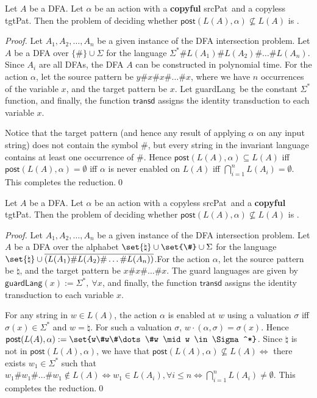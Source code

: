 \documentclass[12pt, a4paper]{article}
\newcommand{\T}{\textsf{transd}}
\newcommand{\post}{\textsf{post}}
\newcommand{\spat}{\textsf{srcPat}}
\newcommand{\tpat}{\textsf{tgtPat}}
\newcommand{\guardL}{\textsf{guardLang}}
\newcommand{\alphabet}{\Sigma}
\renewcommand{\aut}{A}
\begin{document}
\begin{lemma}
	Let $A$ be a DFA. Let $\alpha$ be an action with a \textbf{copyful} \spat\ and a copyless \tpat. Then the problem of deciding whether
	$\post(L(A), \alpha) \not\subseteq L(A)$ is \psph.
\end{lemma}
%
\begin{proof}
	Let $A_1, A_2, \dots, A_n$ be a given instance of the DFA intersection problem. Let $\aut$ be a DFA over  $\{\# \} \cup \alphabet$ for the
	language $\Sigma^*\#L(A_1)\#L(A_2)\#\dots\#L(A_n).$ Since $A_i$ are all DFAs, the DFA $\aut$ can be constructed in polynomial time. For
	the action $\alpha$, let the source pattern be $y\#x\#x\#\dots\#x$, where we have $n$ occurrences of the variable $x$, and the target
	pattern be $x$. Let \guardL\ be the constant $\Sigma^*$ function, and finally, the function $\T$ assigns the identity transduction to each
	variable $x$.
	\medskip

	Notice that the target pattern (and hence any result of applying $\alpha$ on any input string) does not contain the symbol \#, but every
	string in the invariant language contains at least one occurrence of \#. Hence $\post(L(A), \alpha) \subseteq L(A)$ iff
	$\post(L(A), \alpha) = \emptyset$ iff $\alpha$ is never enabled on $L(A)$ iff $\bigcap_{i=1}^n L(A_i) = \emptyset$. This completes the
	reduction.\qed
\end{proof}

\begin{lemma}
	Let $A$ be a DFA. Let $\alpha$ be an action with a copyless \spat\ and a \textbf{copyful} \tpat. Then the problem of deciding whether
	$\post(L(A), \alpha) \not\subseteq L(A)$ is \psph.
\end{lemma}
%
\begin{proof}
	Let $A_1, A_2, \dots, A_n$ be a given instance of the DFA intersection problem. Let $A$ be a DFA over the alphabet
	$\set{\natural} \cup \set{\#} \cup \alphabet$ for the language
	$\set{\natural} \cup \overline{\left(L(A_1)\#L(A_2)\#\dots\#L(A_n)\right)}$.For the action $\alpha$, let the source pattern be $\natural$,
	and the target pattern be $x\#x\#\dots\#x$. The guard languages are given by\\ $\guardL(x) := \Sigma^*,~ \forall x$, and finally, the function $\T$
	assigns the identity transduction to each variable $x$.
\medskip

	For any string in $w \in L(A)$, the action $\alpha$ is enabled at $w$ using a valuation $\sigma$ iff $\sigma(x)\in \Sigma^*$ and
	$w = \natural$. For such a valuation $\sigma$, $w \cdot(\alpha,\sigma)=\sigma(x)$. Hence
	$\post(L(A), \alpha) := \set{w\#w\#\dots\#w \mid w \in \Sigma^*}$. Since $\natural$ is not in $\post(L(A), \alpha)$, we have that
	$\post(L(A), \alpha) \not\subseteq L(A) \iff$ there exists $w_1 \in \Sigma^*$ such that
	$w_1\#w_1\#\dots\#w_1 \not\in L(A) \iff w_1 \in L(A_i),\forall i\leq n \iff \bigcap_{i=1}^nL(A_i) \neq \emptyset$. This completes the
	reduction.\qed
\end{proof}
\end{document}
